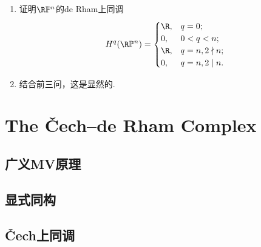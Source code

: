 \begin{itemize}
\begin{enumerate}
        \item[(d)] 证明$\R\mathbb{P}^{n}$的de Rham上同调
        \begin{equation*}\begin{aligned}
            H^{q}(\R\mathbb{P}^{n}) = 
            \begin{cases}
                \R, & q = 0; \\
                0,  & 0 < q < n; \\
                \R, & q = n, 2 \nmid n; \\
                0,  & q = n, 2 \mid n.
            \end{cases}
        \end{aligned}\end{equation*}
        \item[\textbf{证明：}] 结合前三问，这是显然的.
    \end{enumerate}
\end{itemize}

\section{The Čech--de Rham Complex}
\subsection{广义MV原理}

\subsection{显式同构}

\subsection{Čech上同调}

